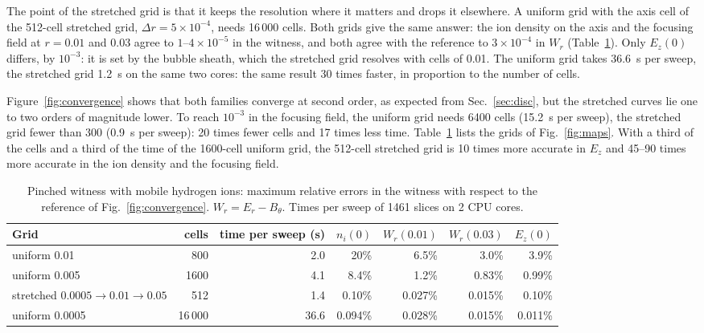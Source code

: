 \documentclass[aps,prab,reprint,floatfix,superscriptaddress,amsmath,amssymb]{revtex4-2}
\begin{document}
The point of the stretched grid is that it keeps the resolution where it matters and drops it elsewhere. A uniform grid with the axis cell of the 512-cell stretched grid, $\Delta r = 5\times10^{-4}$, needs 16\,000 cells. Both grids give the same answer: the ion density on the axis and the focusing field at $r = 0.01$ and $0.03$ agree to $1$--$4\times10^{-5}$ in the witness, and both agree with the reference to $3\times10^{-4}$ in $W_r$ (Table~\ref{tab:pinch}). Only $E_z(0)$ differs, by $10^{-3}$: it is set by the bubble sheath, which the stretched grid resolves with cells of 0.01. The uniform grid takes 36.6~s per sweep, the stretched grid 1.2~s on the same two cores: the same result 30 times faster, in proportion to the number of cells.

Figure~\ref{fig:convergence} shows that both families converge at second order, as expected from Sec.~\ref{sec:disc}, but the stretched curves lie one to two orders of magnitude lower. To reach $10^{-3}$ in the focusing field, the uniform grid needs 6400 cells (15.2~s per sweep), the stretched grid fewer than 300 (0.9~s per sweep): 20 times fewer cells and 17 times less time. Table~\ref{tab:pinch} lists the grids of Fig.~\ref{fig:maps}. With a third of the cells and a third of the time of the 1600-cell uniform grid, the 512-cell stretched grid is 10 times more accurate in $E_z$ and 45--90 times more accurate in the ion density and the focusing field.

\begin{table}[t]
\caption{Pinched witness with mobile hydrogen ions: maximum relative errors in the witness with respect to the reference of Fig.~\ref{fig:convergence}. $W_r = E_r - B_\theta$. Times per sweep of 1461 slices on 2 CPU cores.}
\label{tab:pinch}
\begin{ruledtabular}
\begin{tabular}{lrrrrrr}
Grid & cells & time per sweep (s) & $n_i(0)$ & $W_r(0.01)$ & $W_r(0.03)$ & $E_z(0)$ \\ \hline
uniform 0.01 & 800 & 2.0 & 20\% & 6.5\% & 3.0\% & 3.9\% \\
uniform 0.005 & 1600 & 4.1 & 8.4\% & 1.2\% & 0.83\% & 0.99\% \\
stretched $0.0005\to0.01\to0.05$ & 512 & 1.4 & 0.10\% & 0.027\% & 0.015\% & 0.10\% \\
uniform 0.0005 & 16\,000 & 36.6 & 0.094\% & 0.028\% & 0.015\% & 0.011\% \\
\end{tabular}
\end{ruledtabular}
\end{table}
\end{document}
